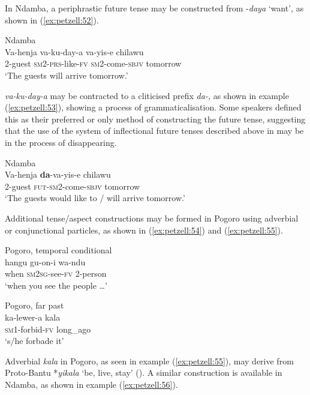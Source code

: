 \documentclass[output=paper,
            colorlinks, citecolor=brown
            ,draftmode
		  ]{langscibook}
\begin{document}
In Ndamba, a periphrastic future tense may be constructed from -\textit{daya} `want', as shown in  (\ref{ex:petzell:52}).


\ea\label{ex:petzell:52}Ndamba\\
\gll Va-henja  va-ku-day-a      va-yis-e        chilawu\\
\textsc{2-}{guest} \textsc{sm}2-\textsc{prs}{}-like-\textsc{fv}    \textsc{sm}2-come-\textsc{sbjv} {tomorrow}\\
\glt `The guests will arrive tomorrow.'
\z


\textit{va-ku-day-a} may be contracted to a cliticised prefix \textit{da-,} as shown in example (\ref{ex:petzell:53}), showing a process of grammaticalisation. Some speakers defined this as their preferred or only method of constructing the future tense, suggesting that the use of the system of inflectional future tenses described above in   may be in the process of disappearing.

\largerpage
\ea\label{ex:petzell:53}Ndamba\\
\gll Va-henja  \textbf{da}{}-va-yis-e            chilawu \\
\textsc{2-}{guest} \textsc{fut}{}-\textsc{sm2}{}-come-\textsc{sbjv} {tomorrow}\\
\glt `The guests would like to / will arrive tomorrow.'
\z


Additional tense/aspect constructions may be formed in Pogoro using adverbial or conjunctional particles, as shown in  (\ref{ex:petzell:54}) and (\ref{ex:petzell:55}).


\ea\label{ex:petzell:54}Pogoro, temporal conditional\\
\gll hangu     gu-on-i         wa-ndu \\
when     \textsc{sm}2\textsc{sg}{}-see-\textsc{fv}     2-person\\
\glt `when you see the people \ldots'


\ex\label{ex:petzell:55}Pogoro, far past\\
\gll ka-lewer-a       kala \\
\textsc{sm}1-forbid-\textsc{fv}   long\_ago\\
\glt `s/he forbade it'
\z


Adverbial \textit{kala} in Pogoro, as seen in example (\ref{ex:petzell:55}), may derive from Proto-Bantu *\textit{yikala} ‘be, live, stay’ (\citealt[166]{NursePhilippson2006}). A similar construction is available in Ndamba, as shown in example (\ref{ex:petzell:56}).
\end{document}
